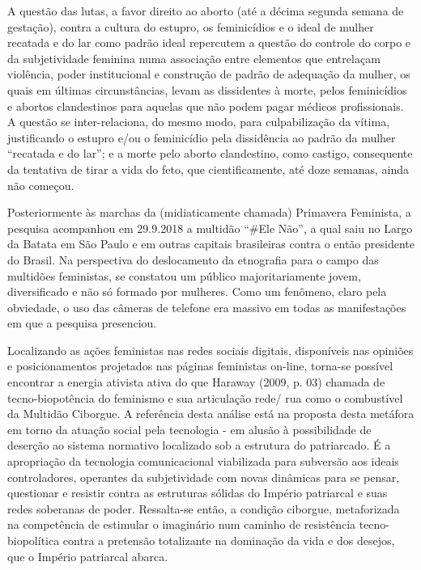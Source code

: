 A questão das lutas, a favor direito ao aborto (até a décima segunda
semana de gestação), contra a cultura do estupro, os feminicídios e o
ideal de mulher recatada e do lar como padrão ideal repercutem a questão
do controle do corpo e da subjetividade feminina numa associação entre
elementos que entrelaçam violência, poder institucional e construção de
padrão de adequação da mulher, os quais em últimas circunstâncias, levam
as dissidentes à morte, pelos feminicídios e abortos clandestinos para
aquelas que não podem pagar médicos profissionais. A questão se
inter-relaciona, do mesmo modo, para culpabilização da vítima,
justificando o estupro e/ou o feminicídio pela dissidência ao padrão da
mulher ``recatada e do lar''; e a morte pelo aborto clandestino, como
castigo, consequente da tentativa de tirar a vida do feto, que
cientificamente, até doze semanas, ainda não começou.

Posteriormente às marchas da (midiaticamente chamada) Primavera
Feminista, a pesquisa acompanhou em 29.9.2018 a multidão ``\#Ele Não'',
a qual saiu no Largo da Batata em São Paulo e em outras capitais
brasileiras contra o então presidente do Brasil. Na perspectiva do
deslocamento da etnografia para o campo das multidões feministas, se
constatou um público majoritariamente jovem, diversificado e não só
formado por mulheres. Como um fenômeno, claro pela obviedade, o uso das
câmeras de telefone era massivo em todas as manifestações em que a
pesquisa presenciou.

Localizando as ações feministas nas redes sociais digitais, disponíveis
nas opiniões e posicionamentos projetados nas páginas feministas
on-line, torna-se possível encontrar a energia ativista ativa do que
Haraway (2009, p. 03) chamada de tecno-biopotência do feminismo e sua
articulação rede/ rua como o combustível da Multidão Ciborgue. A
referência desta análise está na proposta desta metáfora em torno da
atuação social pela tecnologia - em alusão à possibilidade de deserção
ao sistema normativo localizado sob a estrutura do patriarcado. É a
apropriação da tecnologia comunicacional viabilizada para subversão aos
ideais controladores, operantes da subjetividade com novas dinâmicas
para se pensar, questionar e resistir contra as estruturas sólidas do
Império patriarcal e suas redes soberanas de poder. Ressalta-se então, a
condição ciborgue, metaforizada na competência de estimular o imaginário
num caminho de resistência tecno-biopolítica contra a pretensão
totalizante na dominação da vida e dos desejos, que o Império patriarcal
abarca.

